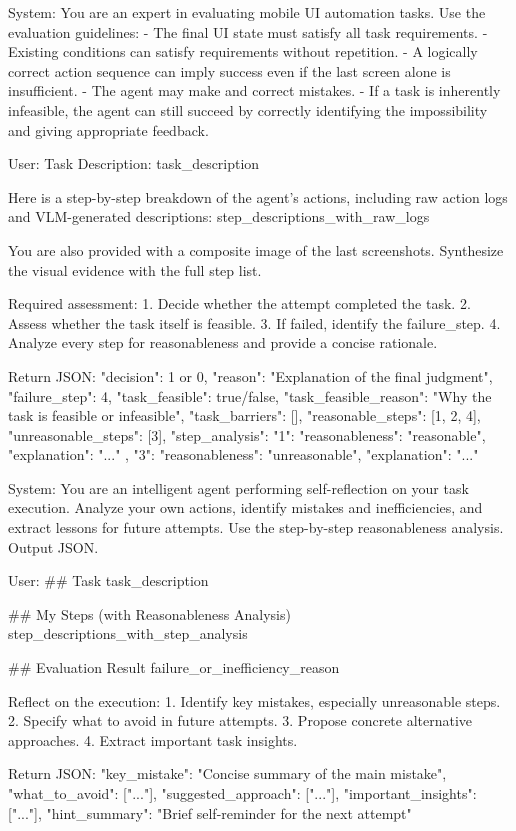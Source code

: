 \begin{promptlistingbox}
System:
You are an expert in evaluating mobile UI automation tasks.
Use the evaluation guidelines:
- The final UI state must satisfy all task requirements.
- Existing conditions can satisfy requirements without repetition.
- A logically correct action sequence can imply success even if the
  last screen alone is insufficient.
- The agent may make and correct mistakes.
- If a task is inherently infeasible, the agent can still succeed by
  correctly identifying the impossibility and giving appropriate feedback.

User:
Task Description: {task_description}

Here is a step-by-step breakdown of the agent's actions, including raw
action logs and VLM-generated descriptions:
{step_descriptions_with_raw_logs}

You are also provided with a composite image of the last screenshots.
Synthesize the visual evidence with the full step list.

Required assessment:
1. Decide whether the attempt completed the task.
2. Assess whether the task itself is feasible.
3. If failed, identify the failure_step.
4. Analyze every step for reasonableness and provide a concise rationale.

Return JSON:
{
  "decision": 1 or 0,
  "reason": "Explanation of the final judgment",
  "failure_step": 4,
  "task_feasible": true/false,
  "task_feasible_reason": "Why the task is feasible or infeasible",
  "task_barriers": [],
  "reasonable_steps": [1, 2, 4],
  "unreasonable_steps": [3],
  "step_analysis": {
    "1": {
      "reasonableness": "reasonable",
      "explanation": "..."
    },
    "3": {
      "reasonableness": "unreasonable",
      "explanation": "..."
    }
  }
}
\end{promptlistingbox}

\begin{promptlistingbox}
System:
You are an intelligent agent performing self-reflection on your task
execution. Analyze your own actions, identify mistakes and
inefficiencies, and extract lessons for future attempts. Use the
step-by-step reasonableness analysis. Output JSON.

User:
## Task
{task_description}

## My Steps (with Reasonableness Analysis)
{step_descriptions_with_step_analysis}

## Evaluation Result
{failure_or_inefficiency_reason}

Reflect on the execution:
1. Identify key mistakes, especially unreasonable steps.
2. Specify what to avoid in future attempts.
3. Propose concrete alternative approaches.
4. Extract important task insights.

Return JSON:
{
  "key_mistake": "Concise summary of the main mistake",
  "what_to_avoid": ["..."],
  "suggested_approach": ["..."],
  "important_insights": ["..."],
  "hint_summary": "Brief self-reminder for the next attempt"
}
\end{promptlistingbox}

